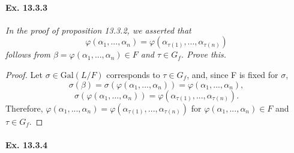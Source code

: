 \documentclass[11pt,a4paper]{article}
\newcommand{\Gal}{\mathrm{Gal}}
\begin{document}
\paragraph{Ex. 13.3.3}

{\it In the proof of proposition 13.3.2, we asserted that $$\varphi (\alpha_1,...,\alpha_n)=\varphi (\alpha_{\tau(1)},...,\alpha_{\tau(n)})$$ follows from $\beta=\varphi (\alpha_1,...,\alpha_n) \in F$ and $\tau \in G_f$. Prove this.

\begin{proof}
Let $\sigma \in \Gal(L/F)$ corresponds to $\tau \in G_f$, and, since F is fixed for $\sigma$, 
$$\sigma(\beta)=\sigma(\varphi (\alpha_1,...,\alpha_n))=\varphi (\alpha_1,...,\alpha_n), $$ 
$$\sigma(\varphi (\alpha_1,...,\alpha_n))=\varphi (\alpha_{\tau(1)},...,\alpha_{\tau(n)}). $$
Therefore, $\varphi (\alpha_1,...,\alpha_n)=\varphi (\alpha_{\tau(1)},...,\alpha_{\tau(n)})$ for $\varphi (\alpha_1,...,\alpha_n) \in F$ and $\tau \in G_f$.
\end{proof}
}

\paragraph{Ex. 13.3.4}
\end{document}
